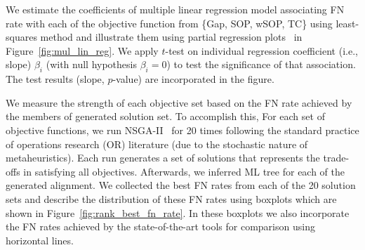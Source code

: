 We estimate the coefficients of multiple linear regression model associating FN rate with each of the objective function from \{Gap, SOP, wSOP, TC\} using least-squares method and illustrate them using partial regression plots~\citep{montgomery2012introduction} in Figure~\ref{fig:mul_lin_reg}. We apply $t$-test on individual regression coefficient (i.e., slope) $\beta_i$ (with null hypothesis $\beta_i=0$) to test the significance of that association. The test results (slope, $p$-value) are incorporated in the figure.

We measure the strength of each objective set based on the FN rate achieved by the members of generated solution set. To accomplish this, For each set of objective functions, we run NSGA-II~\citep{deb2002fast} for 20 times following the standard practice of operations research (OR) literature (due to the stochastic nature of metaheuristics). Each run generates a set of solutions that represents the trade-offs in satisfying all objectives. Afterwards, we inferred ML tree for each of the generated alignment. We collected the best FN rates from each of the 20 solution sets and describe the distribution of these FN rates using boxplots which are shown in Figure~\ref{fig:rank_best_fn_rate}. In these boxplots we also incorporate the FN rates achieved by the state-of-the-art tools for comparison using horizontal lines.

